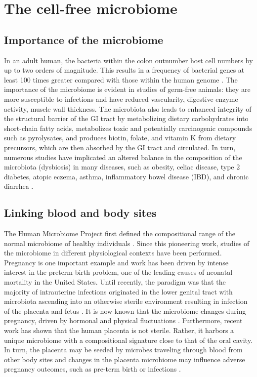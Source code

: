 
\chapter{The cell-free microbiome}

\section{Importance of the microbiome}

In an adult human, the bacteria within the colon outnumber host cell numbers by up to two orders of magnitude. This results in a frequency of bacterial genes at least 100 times greater compared with those within the human genome \cite{Brenchley:2012bm}. The importance of the microbiome is evident in studies of germ-free animals: they are more susceptible to infections and have reduced vascularity, digestive enzyme activity, muscle wall thickness. The microbiota also leads to enhanced integrity of the structural barrier of the GI tract by metabolizing dietary carbohydrates into short-chain fatty acids, metabolizes toxic and potentially carcinogenic compounds such as pyrolysates, and produces biotin, folate, and vitamin K from dietary precursors, which are then absorbed by the GI tract and circulated. In turn, numerous studies have implicated an altered balance in the composition of the microbiota (dysbiosis) in many diseases, such as obesity, celiac disease, type 2 diabetes, atopic eczema, asthma, inflammatory bowel disease (IBD), and chronic diarrhea  \cite{Brenchley:2012bm}.

\section{Linking blood and body sites}

The Human Microbiome Project first defined the compositional range of the normal microbiome of healthy individuals \cite{Consortium:2012bb}. Since this pioneering work, studies of the microbiome in different physiological contexts have been performed. Pregnancy is one important example and work has been driven by intense interest in the preterm birth problem, one of the leading causes of neonatal mortality in the United States. Until recently, the paradigm was that the majority of intrauterine infections originated in the lower genital tract with microbiota ascending into an otherwise sterile environment resulting in infection of the placenta and fetus \cite{Prince:2014gx}. It is now known that the microbiome changes during pregnancy, driven by hormonal and physical fluctuations \cite{Koren:2012ji}. Furthermore, recent work has shown that the human placenta is not sterile. Rather, it harbors a unique microbiome with a compositional signature close to that of the oral cavity. In turn, the placenta may be seeded by microbes traveling through blood from other body sites and changes in the placenta microbiome may influence adverse pregnancy outcomes, such as pre-term birth or infections \cite{Aagaard:2014vk}.

